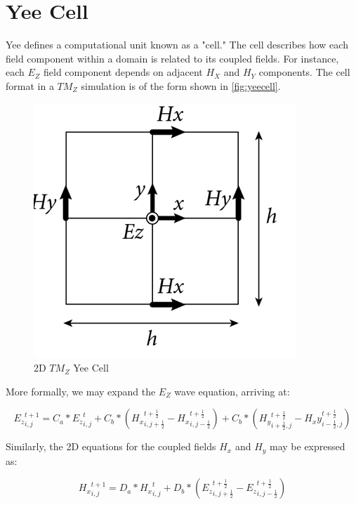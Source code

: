 \section{Yee Cell}

Yee\cite{Yee} defines a computational unit known as a "cell." The cell describes how each field component within a domain is related to its coupled fields. For instance, each $E_Z$ field component depends on adjacent $H_X$ and $H_Y$ components. The cell format in a $TM_Z$ simulation is of the form shown in \autoref{fig:yeecell}.

\begin{figure}[H]
	\centering
	\includegraphics{yee-cell-ez.png}
	\caption{2D $TM_Z$ Yee Cell}
	\label{fig:yeecell}
\end{figure}

More formally, we may expand the $E_Z$ wave equation, arriving at:

\begin{equation} \label{eq:ezupdate}
{E_z}_{i,j}^{t+1} = C_a * {E_z}_{i,j}^{t} 
+ C_b * ({H_x}_{i,j+\frac{1}{2}}^{t+\frac{1}{2}} - {H_x}_{i,j-\frac{1}{2}}^{t+\frac{1}{2}})
+ C_b * ({H_y}_{i+\frac{1}{2},j}^{t+\frac{1}{2}} - {H_xy}_{i-\frac{1}{2},j}^{t+\frac{1}{2}})
\end{equation}

Similarly, the 2D equations for the coupled fields $H_x$ and $H_y$ may be expressed as:

\begin{equation} \label{eq:hxupdate}
{H_x}_{i,j}^{t+1} = D_a * {H_x}_{i,j}^{t} + D_b * (
{E_z}_{i,j+\frac{1}{2}}^{t+\frac{1}{2}} 
-
{E_z}_{i,j-\frac{1}{2}}^{t+\frac{1}{2}}
)  
\end{equation}

